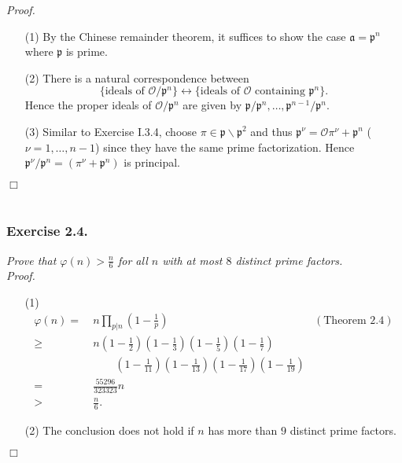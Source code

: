 \documentclass{article}
\begin{document}
\emph{Proof.}
\begin{enumerate}
\item[(1)]
  By the Chinese remainder theorem,
  it suffices to show the case $\mathfrak{a} = \mathfrak{p}^n$ where $\mathfrak{p}$ is prime.

\item[(2)]
  There is a natural correspondence between
  \[
    \{ \text{ideals of $\mathcal{O}/\mathfrak{p}^n$} \}
    \longleftrightarrow
    \{ \text{ideals of $\mathcal{O}$ containing $\mathfrak{p}^n$} \}.
  \]
  Hence the proper ideals of $\mathcal{O}/\mathfrak{p}^n$
  are given by $\mathfrak{p}/\mathfrak{p}^n, \ldots, \mathfrak{p}^{n-1}/\mathfrak{p}^n$.

\item[(3)]
  Similar to Exercise I.3.4,
  choose $\pi \in \mathfrak{p} \smallsetminus \mathfrak{p}^2$
  and thus $\mathfrak{p}^{\nu} = \mathcal{O}\pi^{\nu} + \mathfrak{p}^n$
  ($\nu = 1, \ldots, n-1$)
  since they have the same prime factorization.
  Hence
  $\mathfrak{p}^{\nu}/\mathfrak{p}^n = (\pi^{\nu} + \mathfrak{p}^n)$ is principal.
\end{enumerate}
$\Box$ \\\\






\subsubsection*{Exercise 2.4.}
\emph{Prove that $\varphi(n) > \frac{n}{6}$ for all $n$ with at most $8$ distinct prime factors.} \\



\emph{Proof.}
\begin{enumerate}
\item[(1)]
  \begin{align*}
    \varphi(n)
    = &\:
    n \prod_{p|n}\left( 1 - \frac{1}{p} \right)
      &(\text{Theorem 2.4}) \\
    \geq &\:
    n \left( 1 - \frac{1}{2} \right) \left( 1 - \frac{1}{3} \right)
      \left( 1 - \frac{1}{5} \right) \left( 1 - \frac{1}{7} \right) \\
    & \: \qquad
      \left( 1 - \frac{1}{11} \right) \left( 1 - \frac{1}{13} \right)
      \left( 1 - \frac{1}{17} \right) \left( 1 - \frac{1}{19} \right) \\
    = &\: \frac{55296}{323323} n \\
    > &\: \frac{n}{6}.
  \end{align*}

\item[(2)]
  The conclusion does not hold if $n$ has more than $9$ distinct prime factors.
\end{enumerate}
$\Box$ \\\\
\end{document}
